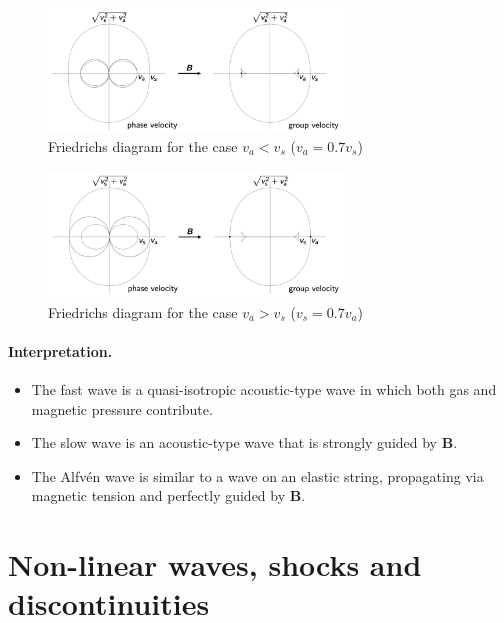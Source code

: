 \documentclass{jknotes}
\newcommand{\B}{\symbf{B}}
\begin{document}
\begin{figure}
	\centering
	\includegraphics[width=0.7\textwidth]{friedrichs_2.png}
	\caption{Friedrichs diagram for the case $v_a < v_s$ ($v_a = 0.7 v_s$)}
	\label{fig:fd1}
\end{figure}
\begin{figure}
	\centering
	\includegraphics[width=0.7\textwidth]{friedrichs_1.png}
	\caption{Friedrichs diagram for the case $v_a > v_s$ ($v_s = 0.7 v_a$)}
	\label{fig:fd2}
\end{figure}

\paragraph{Interpretation.}
\begin{itemize}
	\item The fast wave is a quasi-isotropic acoustic-type wave in which both
		gas and magnetic pressure contribute.
	\item The slow wave is an acoustic-type wave that is strongly guided by
		$\B$.
	\item The Alfv\'{e}n wave is similar to a wave on an elastic string,
		propagating via magnetic tension and perfectly guided by $\B$.
\end{itemize}

\section{Non-linear waves, shocks and discontinuities}
\end{document}
